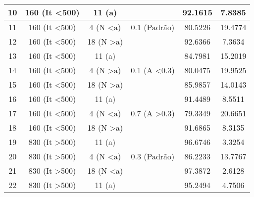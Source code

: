 \documentclass[
	article,			%
	11pt,				%
	oneside,			%
	a4paper,			%
	english,			%
	brazil,				%
	sumario=tradicional
	]{abntex2}
\begin{document}
\begin{table}[h]
\begin{tabular}{|c|c|c|c|c|c|}
		10 & 160 (It \textless 500)                          & 11 (a)                &                          & 92.1615                    & 7.8385                   \\ \hline
		11 & 160 (It \textless 500)                          & 4 (N \textless a)     & 0.1 (Padrão)             & 80.5226                    & 19.4774                  \\ \hline
		12 & 160 (It \textless 500)                          & 18 (N \textgreater a) &                          & 92.6366                    & 7.3634                   \\ \hline
		13 & 160 (It \textless 500)                          & 11 (a)                &                          & 84.7981                    & 15.2019                  \\ \hline
		14 & 160 (It \textless 500)    & 4 (N \textgreater a)  & 0.1 (A \textless 0.3)    & 80.0475                    & 19.9525                  \\ \hline
		15 & 160 (It \textless 500)                          & 18 (N \textgreater a) &                          & 85.9857                    & 14.0143                  \\ \hline
		16 & 160 (It \textless 500)                          & 11 (a)                &                          & 91.4489                    & 8.5511                   \\ \hline
		17 & 160 (It \textless 500)                          & 4 (N \textless a)     & 0.7 (A \textgreater 0.3) & 79.3349                    & 20.6651                  \\ \hline
		18 & 160 (It \textless 500)                          & 18 (N \textgreater a) &                          & 91.6865                    & 8.3135                   \\ \hline
		19 & 830 (It \textgreater 500)                          & 11 (a)                &                          & 96.6746                    & 3.3254                   \\ \hline
		20 & 830 (It \textgreater 500)                          & 4 (N \textless a)     & 0.3 (Padrão)             & 86.2233                    & 13.7767                  \\ \hline
		21 & 830 (It \textgreater 500)                          & 18 (N \textless a)    &                          & 97.3872                    & 2.6128                   \\ \hline
		22 & 830 (It \textgreater 500)                          & 11 (a)                &                          & 95.2494                    & 4.7506                   \\ \hline

\end{tabular}
\end{table}
\end{document}
